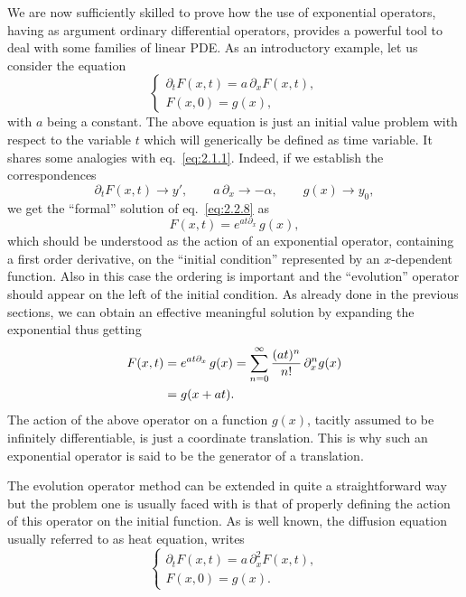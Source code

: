 We are now sufficiently skilled to prove how the use of exponential operators, having as argument ordinary differential operators, provides a powerful tool to deal with some families of linear PDE. As an introductory example, let us consider the equation
\begin{equation}
\begin{cases}
\partial_{t}F(x,t)=a\,\partial_{x}F(x,t),\\[1mm]
F(x,0)=g(x),
\end{cases}
\label{eq:2.2.8}
\end{equation}
with $a$ being a constant. The above equation is just an initial value problem with respect to the variable $t$ which will generically be defined as time variable. It shares some analogies with eq.~\eqref{eq:2.1.1}. Indeed, if we establish the correspondences
\begin{equation}
\partial_{t}F(x,t)\rightarrow y',\qquad
a\,\partial_{x}\rightarrow -\alpha,\qquad
g(x)\rightarrow y_{0},
\label{eq:2.2.9}
\end{equation}
we get the ``formal'' solution of eq.~\eqref{eq:2.2.8} as
\begin{equation}
F(x,t)=e^{a t\partial_{x}}\,g(x),
\label{eq:2.2.10}
\end{equation}
which should be understood as the action of an exponential operator, containing a first order derivative, on the ``initial condition'' represented by an $x$-dependent function. Also in this case the ordering is important and the ``evolution'' operator should appear on the left of the initial condition. As already done in the previous sections, we can obtain an effective meaningful solution by expanding the exponential thus getting
\begin{align}
F(x,t)&=e^{a t\partial_{x}}\,g(x)
=\sum_{n=0}^{\infty}\frac{(a t)^{n}}{n!}\,\partial_{x}^{n}g(x)\notag\\
&=g(x+at).
\label{eq:2.2.11}
\end{align}
The action of the above operator on a function $g(x)$, tacitly assumed to be infinitely differentiable, is just a coordinate translation. This is why such an exponential operator is said to be the generator of a translation.

The evolution operator method can be extended in quite a straightforward way but the problem one is usually faced with is that of properly defining the action of this operator on the initial function. As is well known, the diffusion equation usually referred to as heat equation, writes
\begin{equation}
\begin{cases}
\partial_{t}F(x,t)=a\,\partial_{x}^{2}F(x,t),\\[1mm]
F(x,0)=g(x).
\end{cases}
\label{eq:2.2.12}
\end{equation}

